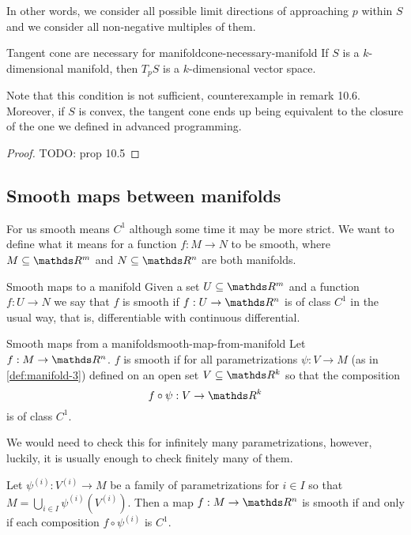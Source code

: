 \documentclass[12pt]{extarticle}
\begin{document}
In other words, we consider all possible limit directions of approaching $p$ within $S$ and we
consider all non-negative multiples of them.

\begin{proposition}{Tangent cone are necessary for manifold}{cone-necessary-manifold}
	If $S$ is a $k$-dimensional manifold, then $T_p S$ is a $k$-dimensional vector space.
\end{proposition}

Note that this condition is not sufficient, counterexample in remark 10.6.
Moreover, if $S$ is convex, the tangent cone ends up being equivalent to the closure of the one we
defined in advanced programming.

\begin{proof}
	TODO: prop 10.5
\end{proof}

\subsection{Smooth maps between manifolds}

For us smooth means $C^1$ although some time it may be more strict.
We want to define what it means for a function $f: M \to N$ to be smooth, where $M \subseteq \R^m$
and $N \subseteq \R^n$ are both manifolds.

\begin{definition}{Smooth maps to a manifold}{}
	Given a set $U \subseteq \R^m$ and a function $f: U \to N$ we say that $f$ is smooth if
	$f: U \to \R^n$ is of class $C^1$ in the usual way, that is, differentiable with continuous
	differential.
\end{definition}

\begin{definition}{Smooth maps from a manifold}{smooth-map-from-manifold}
	Let $f: M \to \R^n$. $f$ is smooth if for all parametrizations $\psi: V \to M$
	(as in \cref{def:manifold-3}) defined on an open set $V \subseteq \R^k$ so that the composition
	\begin{equation}
		f \circ \psi: V \to \R^k
	\end{equation}
	is of class $C^1$.
\end{definition}

We would need to check this for infinitely many parametrizations, however, luckily, it is usually
enough to check finitely many of them.

\begin{proposition}{}{}
	Let $\psi^{(i)}: V^{(i)} \to M$ be a family of parametrizations for $i \in I$ so that
	$M = \bigcup_{i \in I} \psi^{(i)}(V^{(i)})$.
	Then a map $f: M \to \R^n$ is smooth if and only if each composition $f \circ \psi^{(i)}$ is
	$C^1$.
\end{proposition}
\end{document}
